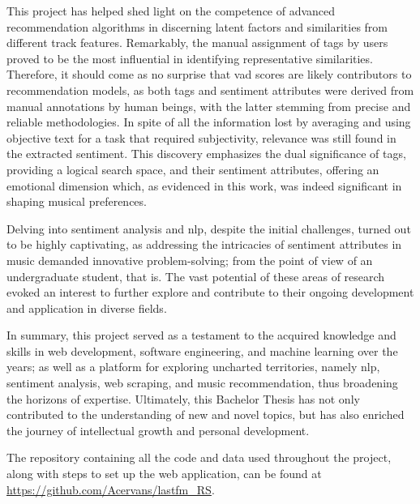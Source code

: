 This project has helped shed light on the competence of advanced recommendation algorithms in discerning latent factors and similarities from different track features. Remarkably, the manual assignment of tags by users proved to be the most influential in identifying representative similarities. Therefore, it should come as no surprise that \acs{vad} scores are likely contributors to recommendation models, as both tags and sentiment attributes were derived from manual annotations by human beings, with the latter stemming from precise and reliable methodologies. In spite of all the information lost by averaging and using objective text for a task that required subjectivity, relevance was still found in the extracted sentiment. This discovery emphasizes the dual significance of tags, providing a logical search space, and their sentiment attributes, offering an emotional dimension which, as evidenced in this work, was indeed significant in shaping musical preferences.

Delving into sentiment analysis and \acs{nlp}, despite the initial challenges, turned out to be highly captivating, as addressing the intricacies of sentiment attributes in music demanded innovative problem-solving; from the point of view of an undergraduate student, that is. The vast potential of these areas of research evoked an interest to further explore and contribute to their ongoing development and application in diverse fields.

In summary, this project served as a testament to the acquired knowledge and skills in web development, software engineering, and machine learning over the years; as well as a platform for exploring uncharted territories, namely \acs{nlp}, sentiment analysis, web scraping, and music recommendation, thus broadening the horizons of expertise. Ultimately, this Bachelor Thesis has not only contributed to the understanding of new and novel topics, but has also enriched the journey of intellectual growth and personal development.

The repository containing all the code and data used throughout the project, along with steps to set up the web application, can be found at \url{https://github.com/Acervans/lastfm_RS}.